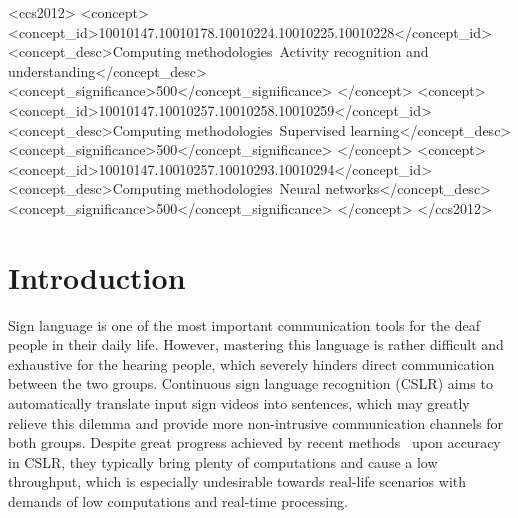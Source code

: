 \documentclass[sigconf]{acmart}
\begin{document}
\begin{CCSXML}
<ccs2012>
   <concept>
       <concept_id>10010147.10010178.10010224.10010225.10010228</concept_id>
       <concept_desc>Computing methodologies~Activity recognition and understanding</concept_desc>
       <concept_significance>500</concept_significance>
       </concept>
   <concept>
       <concept_id>10010147.10010257.10010258.10010259</concept_id>
       <concept_desc>Computing methodologies~Supervised learning</concept_desc>
       <concept_significance>500</concept_significance>
       </concept>
   <concept>
       <concept_id>10010147.10010257.10010293.10010294</concept_id>
       <concept_desc>Computing methodologies~Neural networks</concept_desc>
       <concept_significance>500</concept_significance>
       </concept>
 </ccs2012>
\end{CCSXML}







\maketitle


\section{Introduction}
Sign language is one of the most important communication tools for the deaf people in their daily life. However, mastering this language is rather difficult and exhaustive for the hearing people, which severely hinders direct communication between the two groups. Continuous sign language recognition (CSLR) aims to automatically translate input sign videos into sentences, which may greatly relieve this dilemma and provide more non-intrusive communication channels for both groups. Despite great progress achieved by recent methods~\cite{Min_2021_ICCV,pu2019iterative,niu2020stochastic,zhou2020spatial,cui2019deep,cheng2020fully,pu2020boosting,koller2017re,niu2020stochastic} upon accuracy in CSLR, they typically bring plenty of computations and cause a low throughput, which is especially undesirable towards real-life scenarios with demands of low computations and real-time processing. 
  
\end{document}
